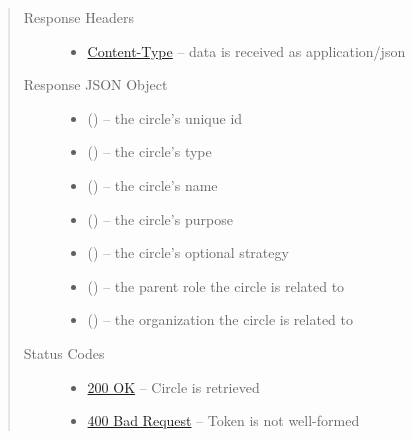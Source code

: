 \documentclass[letterpaper,10pt,english]{sphinxmanual}
\begin{document}
\begin{fulllineitems}
\begin{quote}
\begin{description}
\begin{itemize}
\end{itemize}

\item[{Response Headers}] \leavevmode\begin{itemize}
\item {} 
\href{http://tools.ietf.org/html/rfc7231\#section-3.1.1.5}{Content-Type} -- data is received as application/json

\end{itemize}

\item[{Response JSON Object}] \leavevmode\begin{itemize}
\item {} 
 () -- the circle's unique id

\item {} 
 () -- the circle's type

\item {} 
 () -- the circle's name

\item {} 
 () -- the circle's purpose

\item {} 
 () -- the circle's optional strategy

\item {} 
 () -- the parent role the circle is related to

\item {} 
 () -- the organization the circle is related to

\end{itemize}

\item[{Status Codes}] \leavevmode\begin{itemize}
\item {} 
\href{http://www.w3.org/Protocols/rfc2616/rfc2616-sec10.html\#sec10.2.1}{200 OK} -- Circle is retrieved

\item {} 
\href{http://www.w3.org/Protocols/rfc2616/rfc2616-sec10.html\#sec10.4.1}{400 Bad Request} -- Token is not well-formed


\end{itemize}
\end{description}
\end{quote}
\end{fulllineitems}
\end{document}

